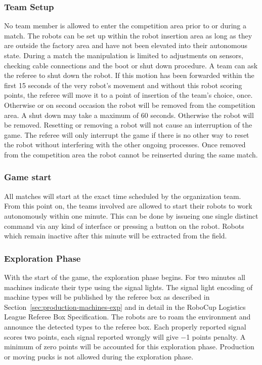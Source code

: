 \documentclass[12pt,twoside]{article}
\newcommand{\refsec}[1]{Section~\ref{#1}}
\begin{document}
\subsubsection{Team Setup}
\label{sec:team-setup}
No team member is allowed to enter the competition area prior to or
during a match. The robots can be set up within the robot insertion
area as long as they are outside the factory area and have not been
elevated into their autonomous state. During a match the manipulation
is limited to adjustments on sensors, checking cable connections and
the boot or shut down procedure. A team can ask the referee to shut
down the robot. If this motion has been forwarded within the first 15
seconds of the very robot's movement and without this robot scoring
points, the referee will move it to a point of insertion of the team's
choice, once. Otherwise or on second occasion the robot will be
removed from the competition area. A shut down may take a maximum of 60 seconds.
Otherwise the robot will be removed. Resetting or removing a robot will not
cause an interruption of the game. The referee will only interrupt the game if
there is no other way to reset the robot without interfering with the other
ongoing processes. Once removed from the competition area the robot cannot be
reinserted during the same match.

\subsubsection{Game start} \label{sec:game-start}
All matches will start at the exact time scheduled by the organization
team. From this point on, the teams involved are allowed to start their
robots to work autonomously within one minute. This can be done by
issueing one single distinct command via any kind of interface or pressing a
button on the robot. Robots which remain inactive after this minute will be
extracted from the field.

\subsubsection{Exploration Phase} \label{sec:expphase} 
With the start of the game, the exploration phase begins. For two
minutes all machines indicate their type using the signal lights. The
signal light encoding of machine types will be published by the referee box
as described in \refsec{sec:production-machines-exp} and in detail in
the RoboCup Logistics League Referee Box Specification. The robots are
to roam the environment and announce the detected types to the referee box.
Each properly reported signal scores two points, each signal reported
wrongly will give \num{-1} points penalty. A minimum of zero points
will be accounted for this exploration phase. Production or moving
pucks is not allowed during the exploration phase.
\end{document}
